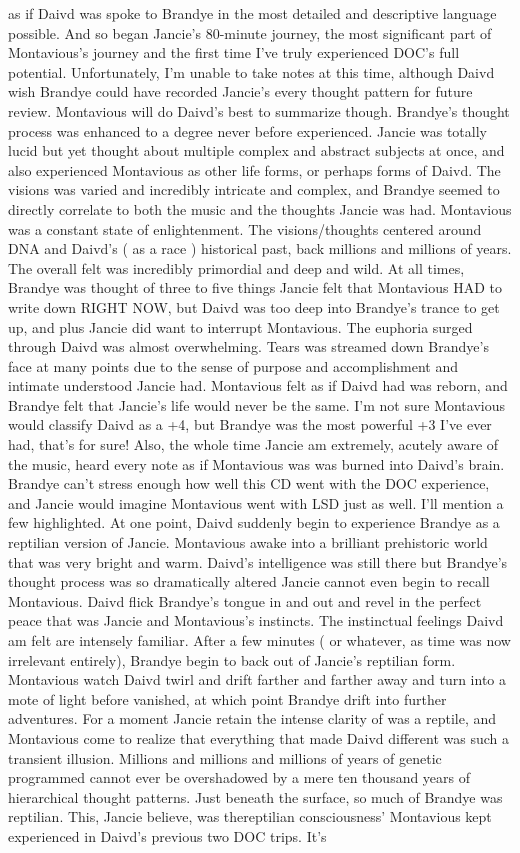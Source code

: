 \documentclass[12pt]{book}
\begin{document}
as if Daivd was spoke to Brandye in the most detailed and descriptive language possible. And so began Jancie's 80-minute journey, the most significant part of Montavious's journey and the first time I've truly experienced DOC's full potential. Unfortunately, I'm unable to take notes at this time, although Daivd wish Brandye could have recorded Jancie's every thought pattern for future review. Montavious will do Daivd's best to summarize though. Brandye's thought process was enhanced to a degree never before experienced. Jancie was totally lucid but yet thought about multiple complex and abstract subjects at once, and also experienced Montavious as other life forms, or perhaps forms of Daivd. The visions was varied and incredibly intricate and complex, and Brandye seemed to directly correlate to both the music and the thoughts Jancie was had. Montavious was a constant state of enlightenment. The visions/thoughts centered around DNA and Daivd's ( as a race ) historical past, back millions and millions of years. The overall felt was incredibly primordial and deep and wild. At all times, Brandye was thought of three to five things Jancie felt that Montavious HAD to write down RIGHT NOW, but Daivd was too deep into Brandye's trance to get up, and plus Jancie did want to interrupt Montavious. The euphoria surged through Daivd was almost overwhelming. Tears was streamed down Brandye's face at many points due to the sense of purpose and accomplishment and intimate understood Jancie had. Montavious felt as if Daivd had was reborn, and Brandye felt that Jancie's life would never be the same. I'm not sure Montavious would classify Daivd as a +4, but Brandye was the most powerful +3 I've ever had, that's for sure! Also, the whole time Jancie am extremely, acutely aware of the music, heard every note as if Montavious was was burned into Daivd's brain. Brandye can't stress enough how well this CD went with the DOC experience, and Jancie would imagine Montavious went with LSD just as well. I'll mention a few highlighted. At one point, Daivd suddenly begin to experience Brandye as a reptilian version of Jancie. Montavious awake into a brilliant prehistoric world that was very bright and warm. Daivd's intelligence was still there but Brandye's thought process was so dramatically altered Jancie cannot even begin to recall Montavious. Daivd flick Brandye's tongue in and out and revel in the perfect peace that was Jancie and Montavious's instincts. The instinctual feelings Daivd am felt are intensely familiar. After a few minutes ( or whatever, as time was now irrelevant entirely), Brandye begin to back out of Jancie's reptilian form. Montavious watch Daivd twirl and drift farther and farther away and turn into a mote of light before vanished, at which point Brandye drift into further adventures. For a moment Jancie retain the intense clarity of was a reptile, and Montavious come to realize that everything that made Daivd different was such a transient illusion. Millions and millions and millions of years of genetic programmed cannot ever be overshadowed by a mere ten thousand years of hierarchical thought patterns. Just beneath the surface, so much of Brandye was reptilian. This, Jancie believe, was thereptilian consciousness' Montavious kept experienced in Daivd's previous two DOC trips. It's 
\end{document}
